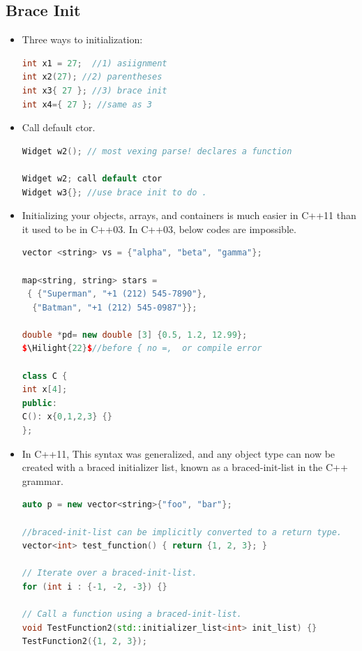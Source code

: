 \documentclass[a4paper,12pt,twoside]{book}
\newcommand{\Hilight}[1]{\makebox[0pt][l]{\color{yellow}\rule[-3pt]{#1em}{11pt}}}
\begin{document}
\subsection{Brace Init}
\begin{itemize}
\item Three ways to initialization:
\begin{lstlisting}[frame=single, language=c++,mathescape=true]
int x1 = 27;  //1) asiignment
int x2(27); //2) parentheses
int x3{ 27 }; //3) brace init
int x4={ 27 }; //same as 3
\end{lstlisting}

\item Call default ctor.
\begin{lstlisting}[frame=single, language=c++,mathescape=true]
Widget w2(); // most vexing parse! declares a function

Widget w2; call default ctor
Widget w3{}; //use brace init to do .
\end{lstlisting}


\item Initializing your objects, arrays, and containers is much easier in C++11 than it used to be in C++03. In C++03, below codes are impossible.
\begin{lstlisting}[frame=single, language=c++,mathescape=true]
vector <string> vs = {"alpha", "beta", "gamma"};

map<string, string> stars =
 { {"Superman", "+1 (212) 545-7890"},
  {"Batman", "+1 (212) 545-0987"}};

double *pd= new double [3] {0.5, 1.2, 12.99};
$\Hilight{22}$//before { no =,  or compile error

class C {
int x[4];
public:
C(): x{0,1,2,3} {}
};
\end{lstlisting}

\item In C++11, This syntax was generalized, and any object type can now be created with a braced initializer list, known as a braced-init-list in the C++ grammar.
\begin{lstlisting}[frame=single, language=c++]
auto p = new vector<string>{"foo", "bar"};

//braced-init-list can be implicitly converted to a return type.
vector<int> test_function() { return {1, 2, 3}; }

// Iterate over a braced-init-list.
for (int i : {-1, -2, -3}) {}

// Call a function using a braced-init-list.
void TestFunction2(std::initializer_list<int> init_list) {}
TestFunction2({1, 2, 3});
\end{lstlisting}


\end{itemize}
\end{document}
